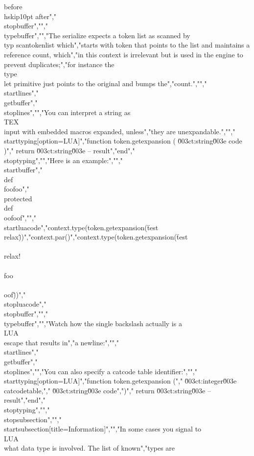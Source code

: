{before\\hskip10pt after}","\\stopbuffer","","\\typebuffer","","The serialize expects a token list as scanned by \\typ {scantokenlist} which","starts with token that points to the list and maintains a reference count, which","in this context is irrelevant but is used in the engine to prevent duplicates;","for instance the \\type {\\let} primitive just points to the original and bumps the","count.","","\\startlines","\\getbuffer","\\stoplines","","You can interpret a string as \\TEX\\ input with embedded macros expanded, unless","they are unexpandable.","","\\starttyping[option=LUA]","function token.getexpansion ( \u003ct:string\u003e code )","    return \u003ct:string\u003e -- result","end","\\stoptyping","","Here is an example:","","\\startbuffer","          \\def\\foo{foo}","\\protected\\def\\oof{oof}","","\\startluacode","context.type(token.getexpansion(\"test \\relax\"))","context.par()","context.type(token.getexpansion(\"test \\\\relax{!} \\\\foo\\\\oof\"))","\\stopluacode","\\stopbuffer","","\\typebuffer","","Watch how the single backslash actually is a \\LUA\\ escape that results in","a newline:","","\\startlines","\\getbuffer","\\stoplines","","You can also specify a catcode table identifier:","","\\starttyping[option=LUA]","function token.getexpansion (","    \u003ct:integer\u003e catcodetable,","    \u003ct:string\u003e  code",")","    return \u003ct:string\u003e -- result","end","\\stoptyping","","\\stopsubsection","","\\startsubsection[title={Information}]","","In some cases you signal to \\LUA\\ what data type is involved. The list of known","types are 